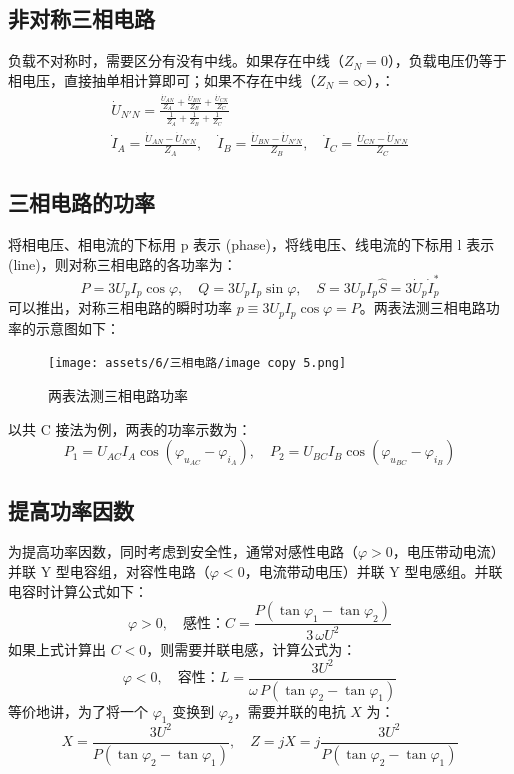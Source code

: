 \documentclass[UTF8]{report}
\theoremstyle{MyLineTheoremStyle} %
\theoremstyle{MyBlockTheoremStyle} %
\theoremstyle{MySubsubsectionStyle} %
\begin{document}
\subsection{非对称三相电路}

负载不对称时，需要区分有没有中线。如果存在中线（$Z_N = 0$），负载电压仍等于相电压，直接抽单相计算即可；如果不存在中线（$Z_N = \infty$），：
\begin{gather}
\dot{U}_{N'N} = \frac{ \frac{\dot{U}_{AN}}{Z_A} + \frac{\dot{U}_{BN}}{Z_B} + \frac{\dot{U}_{CN}}{Z_C}  }{ \frac{1}{Z_A} + \frac{1}{Z_B} + \frac{1}{Z_C} } \\
\dot{I}_{A} = \frac{\dot{U}_{AN} - \dot{U}_{N'N} }{Z_A}, \quad 
\dot{I}_{B} = \frac{\dot{U}_{BN} - \dot{U}_{N'N} }{Z_B}, \quad
\dot{I}_{C} = \frac{\dot{U}_{CN} - \dot{U}_{N'N} }{Z_C}
\end{gather}

\subsection{三相电路的功率}

将相电压、相电流的下标用 p 表示 (phase)，将线电压、线电流的下标用 l 表示 (line)，则对称三相电路的各功率为：
\begin{equation}
P = 3 U_p I_p \cos \varphi,\quad 
Q = 3 U_p I_p \sin \varphi,\quad
S = 3 U_p I_p
\hat{S} = 3 \dot{U}_p \dot{I}_p^*
\end{equation}
可以推出，对称三相电路的瞬时功率 $p \equiv 3 U_p I_p \cos \varphi = P$。两表法测三相电路功率的示意图如下：
\begin{figure}[H]\centering
    \texttt{[image: assets/6/三相电路/image copy 5.png]}
    \caption{两表法测三相电路功率}
\end{figure}

以共 C 接法为例，两表的功率示数为：
\begin{equation}
P_1 = U_{AC} I_A \cos (\varphi_{u_{AC}} - \varphi_{i_A}), \quad 
P_2 = U_{BC} I_B \cos (\varphi_{u_{BC}} - \varphi_{i_B})
\end{equation}

\subsection{提高功率因数}

为提高功率因数，同时考虑到安全性，通常对感性电路（$\varphi > 0$，电压带动电流）并联 Y 型电容组，对容性电路（$\varphi < 0$，电流带动电压）并联 Y 型电感组。并联电容时计算公式如下：
\begin{equation}
\varphi > 0,\quad \text{感性：}
C = \frac{P(\tan \varphi_1 - \tan \varphi_2)}{3\,\omega U^2}
\end{equation}
如果上式计算出 $C < 0$，则需要并联电感，计算公式为：
\begin{equation}
\varphi < 0,\quad \text{容性：}
L = \frac{3 U^2}{\omega \, P (\tan \varphi_2 - \tan \varphi_1)}
\end{equation}
等价地讲，为了将一个 $\varphi_1$ 变换到 $\varphi_2$，需要并联的电抗 $X$ 为：
\begin{equation}
X = \frac{3 U^2}{P (\tan \varphi_2 - \tan \varphi_1)},\quad 
Z = j X = j \frac{3 U^2}{P (\tan \varphi_2 - \tan \varphi_1)} 
\end{equation}
\end{document}
